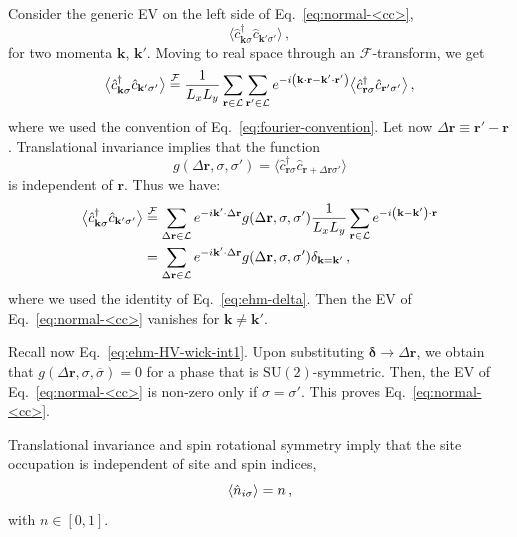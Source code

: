 \begin{tabproof}
	
	Consider the generic EV on the left side of Eq.~\eqref{eq:normal-<cc>},
	\[
		\big\langle \hat c_{\mathbf{k}\sigma}^\dagger \hat c_{\mathbf{k}'\sigma'} \big\rangle \, ,
	\]
	for two momenta $\mathbf{k}$, $\mathbf{k}'$. Moving to real space through an $\mathcal{F}$-transform, we get
	\[
		\big\langle \hat c_{\mathbf{k}\sigma}^\dagger \hat c_{\mathbf{k}'\sigma'} \big\rangle \stackrel{\mathcal{F}}{=} \frac{1}{L_x L_y} \sum_{\mathbf{r} \in \mathcal{L}} \sum_{\mathbf{r}' \in \mathcal{L}} e^{-i \left(\mathbf{k} \cdot \mathbf{r} - \mathbf{k}' \cdot \mathbf{r}' \right)} \big\langle \hat c_{\mathbf{r}\sigma}^\dagger \hat c_{\mathbf{r}'\sigma'} \big\rangle \, ,
	\]
	where we used the convention of Eq.~\eqref{eq:fourier-convention}. Let now $\Delta \mathbf{r} \equiv \mathbf{r}' - \mathbf{r}$. Translational invariance implies that the function
	\[
		g(\Delta \mathbf{r}, \sigma, \sigma') = \big\langle \hat c_{\mathbf{r}\sigma}^\dagger \hat c_{\mathbf{r}+\Delta\mathbf{r}\sigma'} \big\rangle
	\]
	is independent of $\mathbf{r}$. Thus we have:
	\[
	\begin{aligned}
		\big\langle \hat c_{\mathbf{k}\sigma}^\dagger \hat c_{\mathbf{k}'\sigma'} \big\rangle &\stackrel{\mathcal{F}}{=} \sum_{\Delta\mathbf{r} \in \mathcal{L}} e^{-i \mathbf{k}' \cdot \Delta\mathbf{r}} g(\Delta \mathbf{r}, \sigma, \sigma') \frac{1}{L_x L_y} \sum_{\mathbf{r} \in \mathcal{L}} e^{-i \left(\mathbf{k} - \mathbf{k}'\right) \cdot \mathbf{r}} \\
		&= \sum_{\Delta\mathbf{r} \in \mathcal{L}} e^{-i \mathbf{k}' \cdot \Delta\mathbf{r}} g(\Delta \mathbf{r}, \sigma, \sigma') \delta_{\mathbf{k}=\mathbf{k}'} \, ,
	\end{aligned}
	\]
	where we used the identity of Eq.~\eqref{eq:ehm-delta}. Then the EV of Eq.~\eqref{eq:normal-<cc>} vanishes for $\mathbf{k}\neq\mathbf{k}'$. 
	
	Recall now Eq.~\eqref{eq:ehm-HV-wick-int1}. Upon substituting $\bm{\delta} \to \Delta \mathbf{r}$, we obtain that $g(\Delta \mathbf{r},\sigma,\overline{\sigma})=0$ for a phase that is $\mathrm{SU}(2)$-symmetric. Then, the EV of Eq.~\eqref{eq:normal-<cc>} is non-zero only if $\sigma=\sigma'$. This proves Eq.~\eqref{eq:normal-<cc>}.
\end{tabproof}

Translational invariance and spin rotational symmetry imply that the site occupation is independent of site and spin indices,
\begin{equation}\label{eq:normal-<n_i>}
	\ev{\hat n_{i\sigma}} = n \, ,
\end{equation}
with $n \in [0,1]$.

